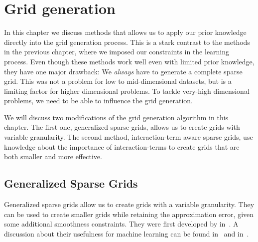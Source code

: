 \chapter{Grid generation}\label{cha:grid-gen}
In this chapter we discuss methods that allows us to apply our prior knowledge directly into the grid generation process.
This is a stark contrast to the methods in the previous chapter, where we imposed our constraints in the learning process.
Even though these methods work well even with limited prior knowledge, they have one major drawback:
We \emph{always} have to generate a complete sparse grid.
This was not a problem for low to mid-dimensional datasets, but is a limiting factor for higher dimensional problems.
To tackle very-high dimensional problems, we need to be able to influence the
grid generation.

We will discuss two modifications of the grid generation algorithm in this
chapter.
The first one, generalized sparse grids, allows us to create grids with variable granularity.
The second method, interaction-term aware sparse grids, use knowledge about the
importance of interaction-terms to create grids that are both smaller and more effective.
\section{Generalized Sparse Grids}\label{sec:generalised-sg}
Generalized sparse grids allow us to create grids with a variable granularity.
They can be used to create smaller grids while retaining the approximation
error, given some additional smoothness constraints.
They were first developed by \citeauthor{optimizedApproxSpaces} in~\cite{optimizedApproxSpaces}.
A discussion about their usefulness for machine learning can be found
in~\cite{sparse-reconstruction} and in~\cite{sparse-parsimony}.

